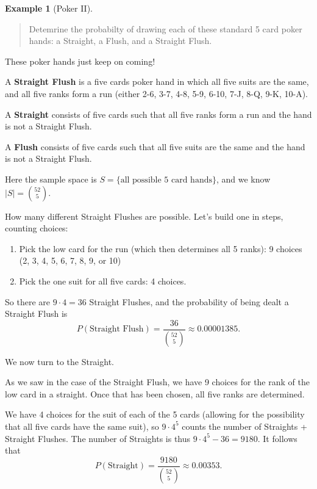 \documentclass[
]{book}
\providecommand{\tightlist}{%
  \setlength{\itemsep}{0pt}\setlength{\parskip}{0pt}}
\theoremstyle{definition}
\theoremstyle{definition}
\newtheorem{example}{Example}[chapter]
\theoremstyle{definition}
\theoremstyle{definition}
\theoremstyle{remark}
\begin{document}
\begin{example}[Poker II]
\protect\hypertarget{exm:poker-2}{}\label{exm:poker-2}\leavevmode

\begin{quote}
Detemrine the probabilty of drawing each of these standard 5 card poker hands: a Straight, a Flush, and a Straight Flush.
\end{quote}

These poker hands just keep on coming!

A \textbf{Straight Flush} is a five cards poker hand in which all five suits are the same, and all five ranks form a run (either 2-6, 3-7, 4-8, 5-9, 6-10, 7-J, 8-Q, 9-K, 10-A).

A \textbf{Straight} consists of five cards such that all five ranks form a run and the hand is not a Straight Flush.

A \textbf{Flush} consists of five cards such that all five suits are the same and the hand is not a Straight Flush.

Here the sample space is \(S = \{\text{all possible 5 card hands}\}\), and we know \(|S| = \binom{52}{5}\).

How many different Straight Flushes are possible. Let's build one in steps, counting choices:

\begin{enumerate}
\def\labelenumi{\arabic{enumi}.}
\tightlist
\item
  Pick the low card for the run (which then determines all 5 ranks): 9 choices (2, 3, 4, 5, 6, 7, 8, 9, or 10)
\item
  Pick the one suit for all five cards: 4 choices.
\end{enumerate}

So there are \(9 \cdot 4 = 36\) Straight Flushes, and the probability of being dealt a Straight Flush is \[P(\text{Straight Flush}) = \frac{36}{\binom{52}{5}} \approx 0.00001385.\]

We now turn to the Straight.

As we saw in the case of the Straight Flush, we have 9 choices for the rank of the low card in a straight. Once that has been chosen, all five ranks are determined.

We have 4 choices for the suit of each of the 5 cards (allowing for the possibility that all five cards have the same suit), so \(9\cdot 4^5\) counts the number of Straights + Straight Flushes. The number of Straights is thus \(9 \cdot 4^5 - 36 = 9180\). It follows that \[P(\text{Straight}) = \frac{9180}{\binom{52}{5}} \approx 0.00353.\]


\end{example}
\end{document}
